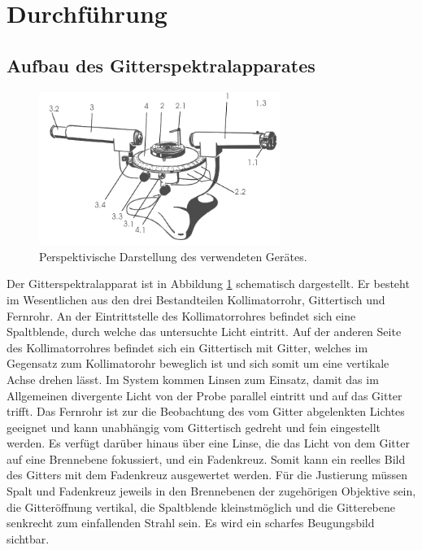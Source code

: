 \section{Durchf\"uhrung}
\label{sec:Durchfuehrung}
\subsection{Aufbau des Gitterspektralapparates}
\begin{figure}
	\centering
	\includegraphics[width=0.7\textwidth]{Bilder/Apparat.png}
	\caption{Perspektivische Darstellung des verwendeten Gerätes. \cite{skript}} 
	\label{fig:Gitterspektralapparat}
\end{figure}
Der Gitterspektralapparat ist in Abbildung \ref{fig:Gitterspektralapparat} schematisch dargestellt.
Er besteht im Wesentlichen aus den drei Bestandteilen Kollimatorrohr, Gittertisch und Fernrohr.
An der Eintrittstelle des Kollimatorrohres befindet sich eine Spaltblende, durch welche das untersuchte Licht eintritt.
Auf der anderen Seite des Kollimatorrohres befindet sich ein Gittertisch mit Gitter, welches im Gegensatz zum Kollimatorohr beweglich ist und sich somit um eine vertikale Achse drehen lässt. 
Im System kommen Linsen zum Einsatz, damit das im Allgemeinen divergente Licht von der Probe parallel eintritt und auf das Gitter trifft.
Das Fernrohr ist zur die Beobachtung des vom Gitter abgelenkten Lichtes geeignet und kann unabhängig vom Gittertisch gedreht und fein eingestellt werden. 
Es verfügt darüber hinaus über eine Linse, die das Licht von dem Gitter auf eine Brennebene fokussiert, und ein Fadenkreuz.
Somit kann ein reelles Bild des Gitters mit dem Fadenkreuz ausgewertet werden.
Für die Justierung müssen Spalt und Fadenkreuz jeweils in den Brennebenen der zugehörigen Objektive sein, die Gitteröffnung vertikal, die Spaltblende kleinstmöglich und die Gitterebene senkrecht zum einfallenden Strahl sein. 
Es wird ein scharfes Beugungsbild sichtbar.
